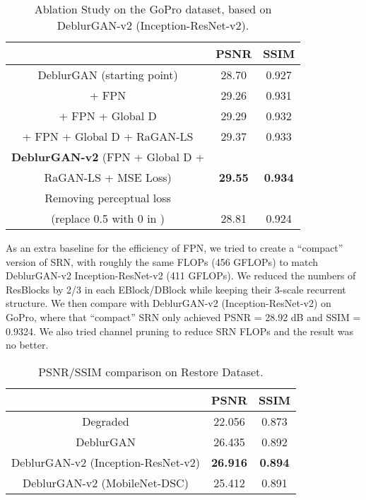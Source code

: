 \documentclass[10pt,twocolumn,letterpaper]{article}
\begin{document}
\begin{table}[htb]
\small
\vspace{-0.5em}
\caption{Ablation Study on the GoPro dataset, based on DeblurGAN-v2 (Inception-ResNet-v2).}
\label{T:restore}
\centering
\setlength\tabcolsep{3pt}
\begin{tabular}{c|c|c}
\toprule
 & PSNR & SSIM \\
\hline
DeblurGAN (starting point) & 28.70 & 0.927  \\
\hline
+ FPN & 29.26  & 0.931 \\
\hline
+ FPN + Global D & 29.29 & 0.932 \\
\hline
+ FPN +  Global D + RaGAN-LS & 29.37 & 0.933 \\
\hline
\textbf{DeblurGAN-v2} (FPN + Global D +  & & \\
RaGAN-LS + MSE Loss) & \textbf{29.55} & \textbf{0.934} \\
\hline
Removing perceptual loss &  &  \\
(replace 0.5 with 0 in ) & 28.81  & 0.924 \\
\bottomrule
\end{tabular}
\vspace{-0.5em}
\end{table}
As an extra baseline for the efficiency of FPN, we tried to create a ``compact'' version of SRN, with roughly the same FLOPs (456 GFLOPs) to match DeblurGAN-v2 Inception-ResNet-v2 (411 GFLOPs). We reduced the numbers of ResBlocks by 2/3 in each EBlock/DBlock while keeping their 3-scale recurrent structure. We then compare with DeblurGAN-v2 (Inception-ResNet-v2) on GoPro, where that ``compact'' SRN only achieved PSNR = 28.92 dB and SSIM = 0.9324. We also tried channel pruning \cite{he2017channel} to reduce SRN FLOPs and the result was no better. 

\begin{table}[htb]
\small
\caption{PSNR/SSIM comparison on Restore Dataset.}
\vspace{-1em}
\label{T:restore}
\centering
\begin{tabular}{c|cc}
\toprule
& PSNR & SSIM \\
\hline
 Degraded & 22.056 &  0.873 \\
DeblurGAN & 26.435 &  0.892 \\
DeblurGAN-v2 (Inception-ResNet-v2) & \textbf{26.916} &  \textbf{0.894} \\
DeblurGAN-v2 (MobileNet-DSC) & 25.412 & 0.891 \\
\bottomrule
\end{tabular}
\vspace{-1.2em}
\label{DVD}
\end{table}
\end{document}
